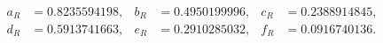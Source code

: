 \begin{align}
 a_R&=0.8235594198, & b_R&=0.4950199996, & c_R&=0.2388914845,\\
 d_R&=0.5913741663, & e_R&=0.2910285032, & f_R&=0.0916740136.
\end{align}
